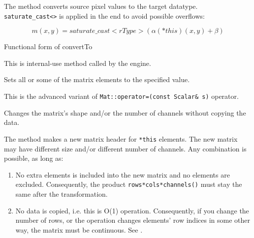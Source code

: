 The method converts source pixel values to the target datatype. \texttt{saturate\_cast<>} is applied in the end to avoid possible overflows:

\[
m(x,y) = saturate\_cast<rType>(\alpha (*this)(x,y) + \beta)
\]

Functional form of convertTo

\begin{description}
\end{description}

This is internal-use method called by the  engine.

Sets all or some of the matrix elements to the specified value.

\begin{description}
\end{description}

This is the advanced variant of \texttt{Mat::operator=(const Scalar\& s)} operator.

Changes the matrix's shape and/or the number of channels without copying the data.


\begin{description}
\end{description}

The method makes a new matrix header for \texttt{*this} elements. The new matrix may have different size and/or different number of channels. Any combination is possible, as long as:
\begin{enumerate}
\item No extra elements is included into the new matrix and no elements are excluded. Consequently,
     the product \texttt{rows*cols*channels()} must stay the same after the transformation.
\item No data is copied, i.e. this is O(1) operation. Consequently, if you change the number of rows, or the operation changes elements' row indices in some other way, the matrix must be continuous. See .
\end{enumerate}

